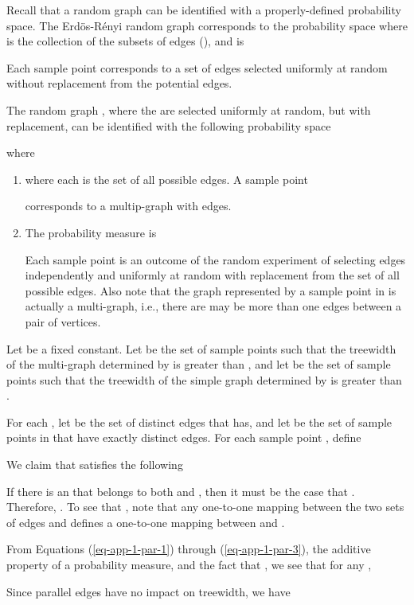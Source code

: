 \documentclass[11pt]{article}
\begin{document}
Recall that a random graph can be identified with a properly-defined 
probability space. The Erd\"{o}s-R\'{e}nyi random graph  corresponds to the probability space   where 
is the collection of the  subsets of  edges (), and 
 is 
    
Each sample point  corresponds to a set of  edges selected 
uniformly at random without replacement from the  potential edges.  

The random graph  , where the  are selected uniformly at random, 
but with replacement, can be identified with the following 
probability space   

where
\begin{enumerate} 
\item  where each 
 is the set of all  possible edges. 
A sample point 

corresponds to a multip-graph with  edges.   
\item The probability measure   is 

Each sample point  is an outcome of the 
random experiment of selecting  edges independently and uniformly at random with replacement
from the set of all possible edges. Also note that the graph represented by 
a sample point in  is actually a multi-graph, i.e., there are may be
more than one edges between a pair of vertices.  
\end{enumerate}

Let  be a fixed constant.
Let  be the set of sample points 
 such that the treewidth of the multi-graph determined by 
 is greater than , and let  
 be the set of sample points  such that the treewidth of the simple graph determined by  is greater than . 
   
For each , let 
 be the set of distinct edges 
that  has, and
let 
be the set of sample points in  that have exactly  distinct edges.
For each sample point , define 
   
We claim that   satisfies the following



If there is an  that belongs to both  and , 
then it must be the case that . Therefore, . To see that 
, note that any one-to-one mapping  between
the two sets of edges  and  defines a one-to-one mapping between
 and . 

From Equations (\ref{eq-app-1-par-1}) through (\ref{eq-app-1-par-3}), 
the additive property of a probability measure, and the fact  that ,
we see that for any ,


Since parallel edges have no impact on treewidth, we have 
\end{document}
